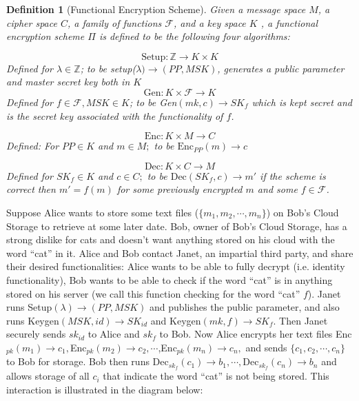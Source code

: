 \documentclass[12pt,twoside]{reedthesis}
\newtheorem{definition}{Definition}
\newcommand{\enc}[0]{\text{Enc}}
\newcommand{\dec}[0]{\text{Dec}}
\newcommand{\Z}[0]{\mathbb{Z}}
\begin{document}
\begin{definition}[Functional Encryption Scheme]
Given a message space $M$, a cipher space $C$, a family of functions $\mathcal{F}$, and a key space $K$ , a functional encryption scheme $\Pi$ is defined to be the following four algorithms:

$$\text{Setup}: \Z \rightarrow K \times K$$
Defined for $\lambda \in \Z$; to be setup($\lambda) \rightarrow (PP,MSK)$, generates a public parameter and master secret key both in $K$
$$\text{Gen}: K \times \mathcal{F} \rightarrow K $$
Defined for $f \in \mathcal{F}, MSK \in K$; to be Gen$(mk,c) \rightarrow SK_f$ which is kept secret and is the secret key associated with the functionality of $f$.

$$\enc: K \times M \rightarrow C$$
Defined: For $PP\in K$ and $m \in M;$ to be $\enc_{PP}(m) \rightarrow c$

$$\dec:K \times C \rightarrow M$$
Defined for $SK_f \in K$ and $c \in C;$ to be $\dec(SK_f,c) \rightarrow m'$ if the scheme is correct then $m' = f(m)$ for some previously encrypted $m$ and some $f\in \mathcal{F}$.

\end{definition}



\par Suppose Alice wants to store some text files ($\{m_1,m_2,\cdots, m_n \}$) on Bob's Cloud Storage to retrieve at some later date.
 Bob, owner of Bob's Cloud Storage, has a strong dislike for cats and doesn't want anything stored on
  his cloud with the word ``cat'' in it. Alice and Bob contact Janet, an impartial third party, and share their desired functionalities: Alice wants to be able to fully decrypt (i.e. identity functionality), Bob wants to be able to check if the word ``cat'' is in anything stored on his server (we call this function checking for the word ``cat'' $f$). Janet runs Setup$(\lambda)\rightarrow (PP, MSK)$ and publishes the public parameter, and also runs Keygen$(MSK,id) \rightarrow SK_{id}$ and Keygen$(mk,f) \rightarrow SK_f$. Then Janet securely sends $sk_{id}$ to Alice and $sk_{f}$ to Bob. Now Alice encrypts her text files Enc$_{pk}(m_1) \rightarrow c_1,$Enc$_{pk}(m_2) \rightarrow c_2, \cdots $,Enc$_{pk}(m_n) \rightarrow c_n,$ and sends $\{c_1,c_2, \cdots, c_n \}$ to Bob for storage. Bob then runs $\dec_{sk_f}(c_1) \rightarrow b_1 , \cdots, \dec_{sk_f}(c_n) \rightarrow b_n $ and allows storage of all $c_i$ that indicate the word ``cat'' is not being stored.  This interaction is illustrated in the diagram below:
  
\end{document}
